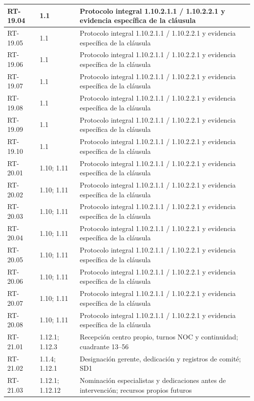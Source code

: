 \begin{longtable}{L{23mm}L{46mm}L{72mm}}
RT-19.04 & 1.1 & Protocolo integral 1.10.2.1.1 / 1.10.2.2.1 y evidencia específica de la cláusula\\\hline
RT-19.05 & 1.1 & Protocolo integral 1.10.2.1.1 / 1.10.2.2.1 y evidencia específica de la cláusula\\\hline
RT-19.06 & 1.1 & Protocolo integral 1.10.2.1.1 / 1.10.2.2.1 y evidencia específica de la cláusula\\\hline
RT-19.07 & 1.1 & Protocolo integral 1.10.2.1.1 / 1.10.2.2.1 y evidencia específica de la cláusula\\\hline
RT-19.08 & 1.1 & Protocolo integral 1.10.2.1.1 / 1.10.2.2.1 y evidencia específica de la cláusula\\\hline
RT-19.09 & 1.1 & Protocolo integral 1.10.2.1.1 / 1.10.2.2.1 y evidencia específica de la cláusula\\\hline
RT-19.10 & 1.1 & Protocolo integral 1.10.2.1.1 / 1.10.2.2.1 y evidencia específica de la cláusula\\\hline
RT-20.01 & 1.10; 1.11 & Protocolo integral 1.10.2.1.1 / 1.10.2.2.1 y evidencia específica de la cláusula\\\hline
RT-20.02 & 1.10; 1.11 & Protocolo integral 1.10.2.1.1 / 1.10.2.2.1 y evidencia específica de la cláusula\\\hline
RT-20.03 & 1.10; 1.11 & Protocolo integral 1.10.2.1.1 / 1.10.2.2.1 y evidencia específica de la cláusula\\\hline
RT-20.04 & 1.10; 1.11 & Protocolo integral 1.10.2.1.1 / 1.10.2.2.1 y evidencia específica de la cláusula\\\hline
RT-20.05 & 1.10; 1.11 & Protocolo integral 1.10.2.1.1 / 1.10.2.2.1 y evidencia específica de la cláusula\\\hline
RT-20.06 & 1.10; 1.11 & Protocolo integral 1.10.2.1.1 / 1.10.2.2.1 y evidencia específica de la cláusula\\\hline
RT-20.07 & 1.10; 1.11 & Protocolo integral 1.10.2.1.1 / 1.10.2.2.1 y evidencia específica de la cláusula\\\hline
RT-20.08 & 1.10; 1.11 & Protocolo integral 1.10.2.1.1 / 1.10.2.2.1 y evidencia específica de la cláusula\\\hline
RT-21.01 & 1.12.1; 1.12.3 & Recepción centro propio, turnos NOC y continuidad; cuadrante 13--56\\\hline
RT-21.02 & 1.1.4; 1.12.1 & Designación gerente, dedicación y registros de comité; SD1\\\hline
RT-21.03 & 1.12.1; 1.12.12 & Nominación especialistas y dedicaciones antes de intervención; recursos propios futuros\\\hline

\end{longtable}
